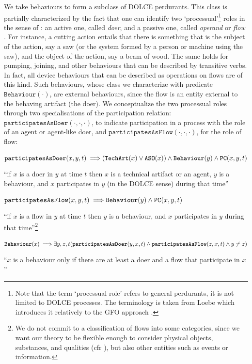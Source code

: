 \documentclass[sw]{iosart2x}
\newcommand{\bflist}{\begin{list}{}{\setlength{\topsep}{2mm}\setlength{\partopsep}{0mm}\setlength{\parsep}{0mm}\setlength{\leftmargin}{9mm}\setlength{\labelwidth}{8mm}}}
\newcommand{\eflist}{\end{list}}
\newcommand{\AxLabel}{\textrm{a}}
\newcounter{cntax}
\newcommand{\myax}[1]{\refstepcounter{cntax}\begin{small}{\bf \AxLabel\thecntax\label{ax:#1}}\end{small}}
\newcommand{\mytext}[1]{``#1''}
\newcommand{\generalStyle}[1]{\texttt{#1}}
\newcommand{\uniRel}[2]{\generalStyle{#1}(#2)}
\newcommand{\triRel}[4]{\generalStyle{#1}(#2,#3,#4)}
\newcommand{\myfi}{\hspace{0.9mm} \Longrightarrow}
\newcommand{\DOLCE}{\textsc{DOLCE}\xspace} %
\newcommand{\DOLCEQuality}[1]{\uniRel{Q}{#1}}
\newcommand{\DOLCEAgent}[1]{\uniRel{{ASO}}{#1}}
\newcommand{\DOLCEPhysObj}[1]{\uniRel{{POB}}{#1}}
\newcommand{\DOLCEPC}[3]{\triRel{{PC}}{#1}{#2}{#3}}
\newcommand{\TechArt}[1]{\uniRel{TechArt}{#1}}
\newcommand{\BehaviourConcrete}[1]{\uniRel{Behaviour}{#1}}
\newcommand{\participateAsDoer}[3]{\triRel{participatesAsDoer}{#1}{#2}{#3}}
\newcommand{\participateAsFlow}[3]{\triRel{participatesAsFlow}{#1}{#2}{#3}}
\newcommand{\firstTimeKeyWord}[1]{\textit{#1}}
\newcommand{\quotes}[1]{`#1'}
\newcommand{\TODO}[1]{{%
}}
\newcommand{\myComment}[1]{{\unskip \ignorespaces}}
\begin{document}
\myComment{Following common practice in the literature, 
in this paper} We take behaviours to form a subclass of \DOLCE perdurants. This class is partially characterized by the fact that one can identify two `processual'\footnote{Note that the term \quotes{processual role} refers to general perdurants, it is not limited to \DOLCE processes. The terminology is taken from Loebe which introduces it relatively to the GFO approach \cite{loebeAbstractVsSocial2007}.} roles in the sense of \cite{loebeAbstractVsSocial2007}: an active one, called \firstTimeKeyWord{doer}, and a passive one, called \firstTimeKeyWord{operand} or \firstTimeKeyWord{flow} \cite{pahl_engineering_2007}. 
For instance, a cutting action entails that there is something that is the subject of the action, say a saw (or the system formed by a person or machine using the saw), and the object of the action, say a beam of wood.
The same holds for pumping, joining, and other behaviours that can be described by transitive verbs. 
In fact, all device behaviours that can be described as operations on flows are of this kind. 
Such behaviours, whose class we characterize with predicate $\BehaviourConcrete{\cdot}$, are external behaviours, since the flow is an entity external to the behaving artifact (the doer).
We conceptualize the two processual roles through two specialisations of the participation relation: $\participateAsDoer{\cdot}{\cdot}{\cdot}$, to indicate participation in a process with the role of an agent or agent-like doer, and $\participateAsFlow{\cdot}{\cdot}{\cdot}$, for the role of flow: 
\bflist
  \item[\myax{participateAsDoerRage}]  $ \participateAsDoer{x}{y}{t} \myfi (\TechArt{x} \lor \DOLCEAgent{x} ) \land \BehaviourConcrete{y} \land \DOLCEPC{x}{y}{t}$\TODO{S: non dovremmo escludere persone/operatori, meglio dire "$\TechArt{x} \lor \DOLCEAgent{x}$" [FC:ok]}
\item \mytext{if $x$ is a doer in $y$ at time $t$ then $x$ is a technical artifact or an agent, $y$ is a behaviour, and $x$ participates in $y$ (in the \DOLCE sense) during that time}
  \item[\myax{participateAsFlowRage}]  $ \participateAsFlow{x}{y}{t} \myfi \myComment{(\DOLCEPhysObj{x} \lor \DOLCEQuality{x} \lor \texttt{AOM}(x)) \land} \BehaviourConcrete{y} \land \DOLCEPC{x}{y}{t}$
\item \mytext{if $x$ is a flow in $y$ at time $t$ then $y$ is a behaviour, and $x$ participates in $y$ during that time}\footnote{We do not commit to a classification of flows into some categories, since we want our theory to be flexible enough to consider physical objects, substances, and qualities (cfr \cite{borgoFormalizationFunctionsOperations2011}), but also other entities such as events or information.}
  \item[\myax{processualRoles}] $ \BehaviourConcrete{x} \myfi \exists y,z,t(\participateAsDoer{y}{x}{t} \land \participateAsFlow{z}{x}{t} \land y \neq z) $ 
\item \mytext{$x$ is a behaviour only if there are at least a doer and a flow that participate in $x$}
\eflist
\end{document}
